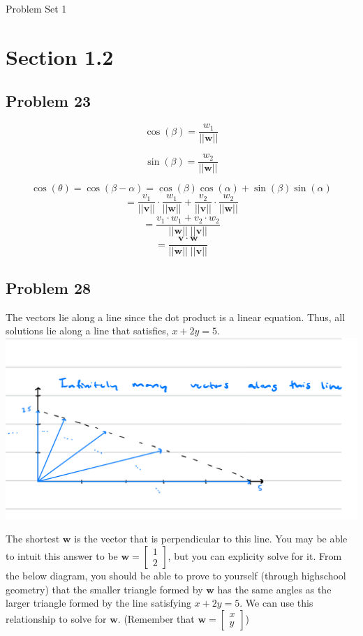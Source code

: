 \documentclass[12pt]{article}
\begin{document}
\begin{center}
    Problem Set 1
\end{center}

\section*{Section 1.2}
\subsection*{Problem 23}
\[\cos(\beta) = \frac{w_1}{\vert \vert \boldsymbol{w} \vert \vert} \]

\[\sin(\beta) = \frac{w_2}{\vert \vert \boldsymbol{w} \vert \vert} \]

\[
\cos(\theta)
= \cos(\beta - \alpha)
= \cos(\beta)\cos(\alpha) + \sin(\beta)\sin(\alpha) 
\]
\[
=   \frac{v_1}{\vert \vert \boldsymbol{v} \vert \vert}
\cdot \frac{w_1}{\vert \vert \boldsymbol{w} \vert \vert}
+ \frac{v_2}{\vert \vert \boldsymbol{v} \vert \vert}
\cdot \frac{w_2}{\vert \vert \boldsymbol{w} \vert \vert}
\]
\[
=   \frac{v_1 \cdot w_1 + v_2 \cdot w_2}
{\vert \vert \boldsymbol{w} \vert \vert \; \vert \vert \boldsymbol{v} \vert \vert}
\]
\[
=   \frac{\boldsymbol{v} \cdot \boldsymbol{w}}
{\vert \vert \boldsymbol{w} \vert \vert \; \vert \vert \boldsymbol{v} \vert \vert}
\]

\subsection*{Problem 28}
The vectors lie along a line since the dot product is a linear equation. Thus, all solutions lie along a line that satisfies, $x + 2y = 5$.
~\\
\includegraphics[scale=0.25]{s12p28a.png}

\noindent The shortest $\boldsymbol{w}$ is the vector that is perpendicular to this line. You may be able to intuit this answer to be $\boldsymbol{w} = \begin{bmatrix} 1 \\ 2 \end{bmatrix}$, but you can explicity solve for it. From the below diagram, you should be able to prove to yourself (through highschool geometry) that the smaller triangle formed by $\boldsymbol{w}$ has the same angles as the larger triangle formed by the line satisfying $x + 2y = 5$. We can use this relationship to solve for $\boldsymbol{w}$. (Remember that $\boldsymbol{w} = \begin{bmatrix} x \\ y \end{bmatrix}$)
\end{document}
